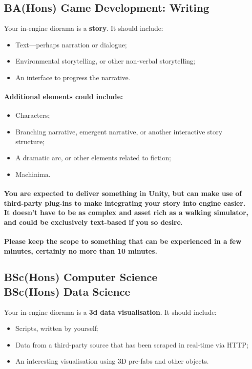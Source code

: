 \documentclass{../../fal_assignment}
\begin{document}
\subsection*{BA(Hons) Game Development: Writing}

Your in-engine diorama is a \textbf{story}. It should include:
\begin{itemize}
\item Text---perhaps narration or dialogue;
\item Environmental storytelling, or other non-verbal storytelling; 
\item An interface to progress the narrative.
\end{itemize}
\paragraph{Additional elements could include:}
\begin{itemize}
\item Characters;
\item Branching narrative, emergent narrative, or another interactive story structure;
\item A dramatic arc, or other elements related to fiction; 
\item Machinima.
\end{itemize}
\paragraph{You are expected to deliver something in Unity, but can make use of third-party plug-ins to make integrating your story into engine easier. It doesn't have to be as complex and asset rich as a walking simulator, and could be exclusively text-based if you so desire.}

\paragraph{Please keep the scope to something that can be experienced in a few minutes, certainly no more than 10 minutes.}

\subsection*{BSc(Hons) Computer Science \\ BSc(Hons) Data Science}

Your in-engine diorama is a \textbf{3d data visualisation}. It should include:
\begin{itemize}
\item Scripts, written by yourself;
\item Data from a third-party source that has been scraped in real-time via HTTP; 
\item An interesting visualisation using 3D pre-fabs and other objects.
\end{itemize}
\end{document}
